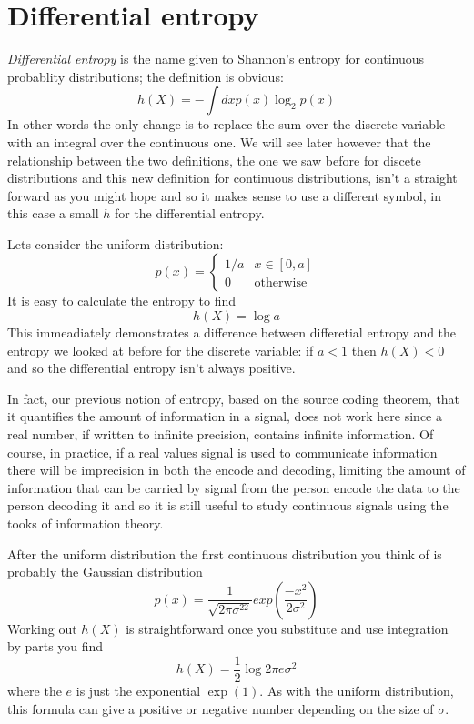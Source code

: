 \documentclass[12pt]{article}
\begin{document}
\section*{Differential entropy} 

\textsl{Differential entropy} is the name given to Shannon's entropy for continuous probablity distributions; the definition is obvious:
\begin{equation}
  h(X)=-\int dx p(x)\log_2{p(x)}
\end{equation}
In other words the only change is to replace the sum over the discrete
variable with an integral over the continuous one. We will see later
however that the relationship between the two definitions, the one we
saw before for discete distributions and this new definition for
continuous distributions, isn't a straight forward as you might hope
and so it makes sense to use a different symbol, in this case a small
$h$ for the differential entropy.

Lets consider the uniform distribution:
\begin{equation}
  p(x)=\left\{\begin{array}{ll}1/a&x\in [0,a]\\0&\mbox{otherwise}\end{array}\right.
\end{equation}
It is easy to calculate the entropy to find
\begin{equation}
  h(X)=\log{a}
\end{equation}
This immeadiately demonstrates a difference between differetial
entropy and the entropy we looked at before for the discrete variable:
if $a<1$ then $h(X)<0$ and so the differential entropy isn't always
positive.

In fact, our previous notion of entropy, based on the source coding
theorem, that it quantifies the amount of information in a signal,
does not work here since a real number, if written to infinite
precision, contains infinite information. Of course, in practice, if a
real values signal is used to communicate information there will be
imprecision in both the encode and decoding, limiting the amount of
information that can be carried by signal from the person encode the
data to the person decoding it and so it is still useful to study
continuous signals using the tooks of information theory.

After the uniform distribution the first continuous distribution you
think of is probably the Gaussian distribution
\begin{equation}
  p(x)=\frac{1}{\sqrt{2\pi \sigma^22}}exp\left(\frac{-x^2}{2\sigma^2}\right)
\end{equation}
Working out $h(X)$ is straightforward once you substitute and use integration by parts you find
\begin{equation}
  h(X)=\frac{1}{2}\log{2\pi e \sigma^2}
\end{equation}
where the $e$ is just the exponential $\exp{(1)}$. As with the uniform
distribution, this formula can give a positive or negative number
depending on the size of $\sigma$.
\end{document}
